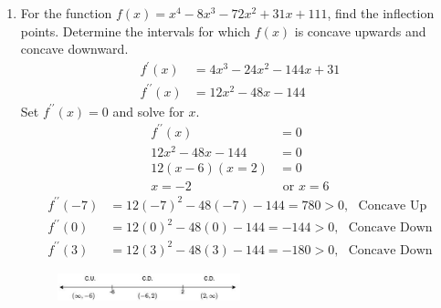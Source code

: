 \documentclass{exam}
\begin{document}
\begin{enumerate}
\item For the function $f(x)=x^{4}-8x^{3}-72x^{2}+31x+111$, find the inflection points. Determine the intervals for which $f(x)$ is concave upwards and concave downward. 
\begin{align*}
                   f^{\prime}(x)& = 4x^{3}-24x^{2}-144x+31\\
                  f^{\prime\prime}(x) & = 12x^{2}-48x-144
\end{align*}
   Set $f^{\prime\prime}(x)=0$ and solve for $x$.
\begin{align*}
             f^{\prime\prime}(x)& = 0\\
                12x^{2}-48x-144 & = 0\\
                   12(x-6)(x=2) & = 0\\
                    x=-2 & \text{ or } x=6
\end{align*}
\begin{align*}
f^{\prime\prime}(-7)& = 12(-7)^{2}-48(-7)-144=780>0, \ \ \ \text{Concave Up}\\
 f^{\prime\prime}(0)& = 12(0)^{2}-48(0)-144=-144>0, \ \ \ \text{Concave Down}\\
 f^{\prime\prime}(3)& = 12(3)^{2}-48(3)-144=-180>0, \ \ \ \text{Concave Down}
\end{align*} 
\begin{figure}[H]
\centering
\includegraphics[width=0.5\textwidth]{Diagram_P16.eps}
\end{figure}


\newpage


\end{enumerate}
\end{document}
